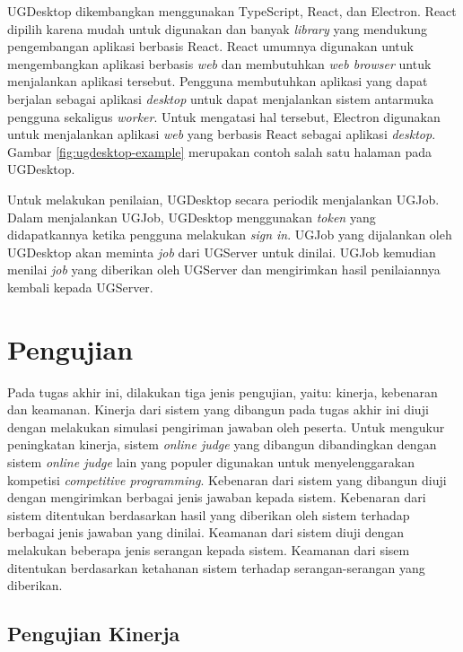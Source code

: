 \par UGDesktop dikembangkan menggunakan TypeScript, React, dan Electron. React dipilih karena mudah untuk digunakan dan banyak \textit{library} yang mendukung pengembangan aplikasi berbasis React. React umumnya digunakan untuk mengembangkan aplikasi berbasis \textit{web} dan membutuhkan \textit{web browser} untuk menjalankan aplikasi tersebut. Pengguna membutuhkan aplikasi yang dapat berjalan sebagai aplikasi \textit{desktop} untuk dapat menjalankan sistem antarmuka pengguna sekaligus \textit{worker}. Untuk mengatasi hal tersebut, Electron digunakan untuk menjalankan aplikasi \textit{web} yang berbasis React sebagai aplikasi \textit{desktop}. Gambar \ref{fig:ugdesktop-example} merupakan contoh salah satu halaman pada UGDesktop.

\par Untuk melakukan penilaian, UGDesktop secara periodik menjalankan UGJob. Dalam menjalankan UGJob, UGDesktop menggunakan \textit{token} yang didapatkannya ketika pengguna melakukan \textit{sign in}. UGJob yang dijalankan oleh UGDesktop akan meminta \textit{job} dari UGServer untuk dinilai. UGJob kemudian menilai \textit{job} yang diberikan oleh UGServer dan mengirimkan hasil penilaiannya kembali kepada UGServer.

\section{Pengujian}

\par Pada tugas akhir ini, dilakukan tiga jenis pengujian, yaitu: kinerja, kebenaran dan keamanan. Kinerja dari sistem yang dibangun pada tugas akhir ini diuji dengan melakukan simulasi pengiriman jawaban oleh peserta. Untuk mengukur peningkatan kinerja, sistem \textit{online judge} yang dibangun dibandingkan dengan sistem \textit{online judge} lain yang populer digunakan untuk menyelenggarakan kompetisi \textit{competitive programming}. Kebenaran dari sistem yang dibangun diuji dengan mengirimkan berbagai jenis jawaban kepada sistem. Kebenaran dari sistem ditentukan berdasarkan hasil yang diberikan oleh sistem terhadap berbagai jenis jawaban yang dinilai. Keamanan dari sistem diuji dengan melakukan beberapa jenis serangan kepada sistem. Keamanan dari sisem ditentukan berdasarkan ketahanan sistem terhadap serangan-serangan yang diberikan.

\subsection{Pengujian Kinerja}

